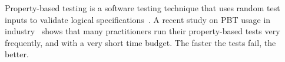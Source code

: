 \documentclass[acmsmall]{acmart}
\theoremstyle{definition}
\begin{document}
%





Property-based testing is a software testing technique that uses
random test inputs to validate logical specifications~\cite{quickcheck00}. A recent study
on PBT usage in industry~\cite{inpractice} shows that many
practitioners run their property-based tests very frequently, and with
a very short time budget.  The faster the tests fail, the better.
\end{document}
